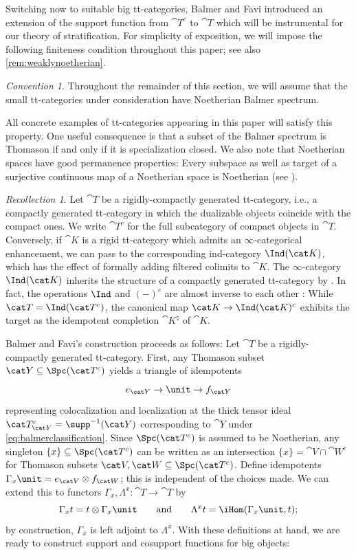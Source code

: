 \documentclass{amsart}%
\numberwithin{equation}{section}%
\theoremstyle{remark}
\newtheorem{Rec}[equation]{Recollection}
\newtheorem{Conv}[equation]{Convention}
\begin{document}
Switching now to suitable big tt-categories, Balmer and Favi \cite{BalmerFavi11} introduced an extension of the support function from $\cat T^c$ to $\cat T$ which will be instrumental for our theory of stratification. For simplicity of exposition, we will impose the following finiteness condition throughout this paper; see also \cref{rem:weaklynoetherian}.

\begin{Conv}
Throughout the remainder of this section, we will assume that the small tt-categories under consideration have Noetherian Balmer spectrum. 
\end{Conv}

All concrete examples of tt-categories appearing in this paper will satisfy this property. One useful consequence is that a subset of the Balmer spectrum is Thomason if and only if it is specialization closed. We also note that Noetherian spaces have good permanence properties: Every subspace as well as target of a surjective continuous map of a Noetherian space is Noetherian (see \cite[Cor.~8.1.6]{DickmannSchwartzTressl19}). 

\begin{Rec}\label{rec:indcat}
Let $\cat T$ be a rigidly-compactly generated tt-category, i.e., a compactly generated tt-category in which the dualizable objects coincide with the compact ones. We write $\cat T^c$ for the full subcategory of compact objects in $\cat T$. Conversely, if $\cat K$ is a rigid tt-category which admits an $\infty$-categorical enhancement, we can pass to the corresponding ind-category $\Ind(\cat K)$, which has the effect of formally adding filtered colimits to $\cat K$. The $\infty$-category $\Ind(\cat K)$ inherits the structure of a compactly generated tt-category by \cite[\S5.3.5]{HTTLurie} \cite[Prop.~1.1.3.6 and Cor.~4.8.1.14]{HALurie}. In fact, the operations $\Ind$ and $(-)^c$ are almost inverse to each other \cite[Prop.~5.5.7.8]{HTTLurie}: While $\cat T = \Ind(\cat T^c)$, the canonical map $\cat K \to \Ind(\cat K)^c$ exhibits the target as the idempotent completion $\cat K^{\natural}$ of $\cat K$.
\end{Rec}

Balmer and Favi's construction proceeds as follows: Let $\cat T$ be a rigidly-compactly generated tt-category. First, any Thomason subset $\cat Y \subseteq \Spc(\cat T^c)$ yields a triangle of idempotents
\[
\xymatrix{e_{\cat Y} \to \unit \to f_{\cat Y}}
\]
representing colocalization and localization at the thick tensor ideal $\cat T^c_{\cat Y} = \supp^{-1}(\cat Y)$ corresponding to $\cat Y$ under \eqref{eq:balmerclassification}. Since $\Spc(\cat T^c)$ is assumed to be Noetherian, any singleton $\{x\} \subseteq \Spc(\cat T^c)$ can be written as an intersection $\{x\} = \cat V \cap \cat W^c$ for Thomason subsets $\cat V, \cat W \subseteq \Spc(\cat T^c)$. Define idempotents $\Gamma_{x}\unit = e_{\cat V} \otimes f_{\cat W}$; this is independent of the choices made. We can extend this to functors $\Gamma_x,\Lambda^x\colon \cat T \to \cat T$ by 
\[
\Gamma_xt = t \otimes \Gamma_x\unit \qquad \text{and} \qquad \Lambda^xt = \iHom(\Gamma_x\unit, t);
\]
by construction, $\Gamma_x$ is left adjoint to $\Lambda^x$. With these definitions at hand, we are ready to construct support and cosupport functions for big objects:
\end{document}
